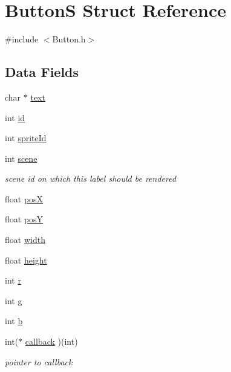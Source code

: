 \hypertarget{struct_button_s}{}\section{ButtonS Struct Reference}
\label{struct_button_s}


{\ttfamily \#include $<$Button.\+h$>$}

\subsection*{Data Fields}
\begin{DoxyCompactItemize}
\item 
char $\ast$ \hyperlink{struct_button_s_a1472d4647423c83d45e4cbdb47c83c6d}{text}
\item 
int \hyperlink{struct_button_s_a27f6bcf4289ea1683f843e077e08663b}{id}
\item 
int \hyperlink{struct_button_s_a877af6fad7f21b78e8410961d6e657de}{sprite\+Id}
\item 
int \hyperlink{struct_button_s_ac309a084a6a5fddffc41aa3347070e1a}{scene}
\begin{DoxyCompactList}\small\item\em scene id on which this label should be rendered \end{DoxyCompactList}\item 
float \hyperlink{struct_button_s_a0a7ff1cff4b5c35552ef4d006caa83a8}{posX}
\item 
float \hyperlink{struct_button_s_a72f32d2935f08a32ab81d1e542f01620}{posY}
\item 
float \hyperlink{struct_button_s_aadb7b9512c6e032223e2b4b3bbb5fd8f}{width}
\item 
float \hyperlink{struct_button_s_a5910c1866330bff6f14855cc2692def9}{height}
\item 
int \hyperlink{struct_button_s_a1e5c75c62cd1108540340ff3641ac8b3}{r}
\item 
int \hyperlink{struct_button_s_a2cb4f7b2ebbc3588bf8fd9a00bdbf184}{g}
\item 
int \hyperlink{struct_button_s_adcc0378cc3208bc12e6c516e46a63e1f}{b}
\item 
int($\ast$ \hyperlink{struct_button_s_af0135c3c34636d2198a07e5adc9ebb9c}{callback} )(int)
\begin{DoxyCompactList}\small\item\em pointer to callback \end{DoxyCompactList}\end{DoxyCompactItemize}


